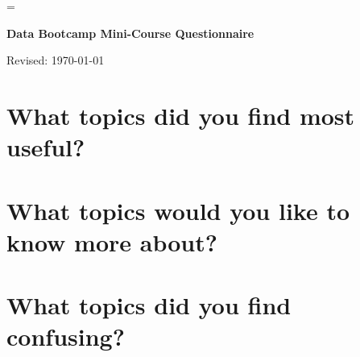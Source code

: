 \documentclass[11pt]{exam}
\begin{document}
\parskip=\bigskipamount
\parindent=0.0in
\thispagestyle{empty}


\bigskip\bigskip
\centerline{\Large \bf Data Bootcamp Mini-Course Questionnaire}
\centerline{Revised: \today}


\vspace{0.25in}
\section*{What topics did you find most useful?} 


\vspace{1.5in}
\section*{What topics would you like to know more about?}   


\vspace{1.5in}
\section*{What topics did you find confusing?}
\end{document}

